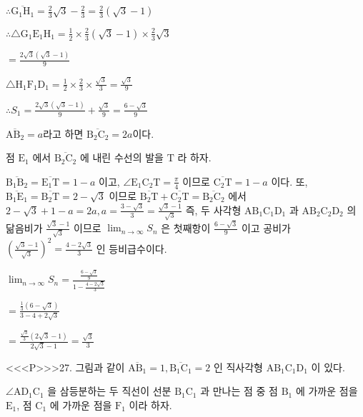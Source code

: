 \documentclass{oblivoir}
\begin{document}
$\therefore \overline{\mathrm{G}_{1} \mathrm{H}_{1}}=\frac{2}{3} \sqrt{3}-\frac{2}{3}=\frac{2}{3}(\sqrt{3}-1)$

$\therefore \triangle \mathrm{G}_{1} \mathrm{E}_{1} \mathrm{H}_{1}=\frac{1}{2} \times \frac{2}{3}(\sqrt{3}-1) \times \frac{2}{3} \sqrt{3}$

$=\frac{2 \sqrt{3}(\sqrt{3}-1)}{9}$

$\triangle \mathrm{H}_{1} \mathrm{F}_{1} \mathrm{D}_{1}=\frac{1}{2} \times \frac{2}{3} \times \frac{\sqrt{3}}{3}=\frac{\sqrt{3}}{9}$

$\therefore S_{1}=\frac{2 \sqrt{3}(\sqrt{3}-1)}{9}+\frac{\sqrt{3}}{9}=\frac{6-\sqrt{3}}{9}$

$\overline{\mathrm{AB}_{2}}=a$라고 하면 $\overline{\mathrm{B}_{2} \mathrm{C}_{2}}=2 a$이다.


점 $\mathrm{E}_{1}$ 에서 $\overline{\mathrm{B}_{2} \mathrm{C}_{2}}$ 에 내린 수선의 발을 $\mathrm{T}$ 라 하자.

$\overline{\mathrm{B}_{1} \mathrm{B}_{2}}=\overline{\mathrm{E}_{1} \mathrm{T}}=1-a$ 이고, $\angle \mathrm{E}_{1} \mathrm{C}_{2} \mathrm{T}=\frac{\pi}{4}$ 이므로 $\overline{\mathrm{C}_{2} \mathrm{T}}=1-a$ 이다. 또, $\overline{\mathrm{B}_{1} \mathrm{E}_{1}}=\overline{\mathrm{B}_{2} \mathrm{T}}=2-\sqrt{3}$ 이므로 $\overline{\mathrm{B}_{2} \mathrm{T}}+\overline{\mathrm{C}_{2} \mathrm{T}}=\overline{\mathrm{B}_{2} \mathrm{C}_{2}}$ 에서 $2-\sqrt{3}+1-a=2 a, a=\frac{3-\sqrt{3}}{3}=\frac{\sqrt{3}-1}{\sqrt{3}}$ 즉, 두 사각형 $\mathrm{AB}_{1} \mathrm{C}_{1} \mathrm{D}_{1}$ 과 $\mathrm{AB}_{2} \mathrm{C}_{2} \mathrm{D}_{2}$ 의 닮음비가 $\frac{\sqrt{3}-1}{\sqrt{3}}$ 이므로 $\lim _{n \rightarrow \infty} S_{n}$ 은 첫째항이 $\frac{6-\sqrt{3}}{9}$ 이고 공비가 $\left(\frac{\sqrt{3}-1}{\sqrt{3}}\right)^{2}=\frac{4-2 \sqrt{3}}{3}$ 인 등비급수이다.

$\lim _{n \rightarrow \infty} S_{n}= \frac{\frac{6-\sqrt{3}}{9}}{1-\frac{4-2 \sqrt{3}}{3}} $

$=\frac{\frac{1}{3}(6-\sqrt{3})}{3-4+2 \sqrt{3}}$

$=\frac{\frac{\sqrt{3}}{3}(2 \sqrt{3}-1)}{2 \sqrt{3}-1}=\frac{\sqrt{3}}{3}$

<<<P>>>27. 그림과 같이 $\overline{\mathrm{AB}_{1}}=1, \overline{\mathrm{B}_{1} \mathrm{C}_{1}}=2$ 인 직사각형 $\mathrm{AB}_{1} \mathrm{C}_{1} \mathrm{D}_{1}$ 이 있다.

$\angle \mathrm{AD}_{1} \mathrm{C}_{1}$ 을 삼등분하는 두 직선이 선분 $\mathrm{B}_{1} \mathrm{C}_{1}$ 과 만나는 점 중 점 $\mathrm{B}_{1}$ 에 가까운 점을 $\mathrm{E}_{1}$,
점 $\mathrm{C}_{1}$ 에 가까운 점을 $\mathrm{F}_{1}$ 이라 하자.
\end{document}
